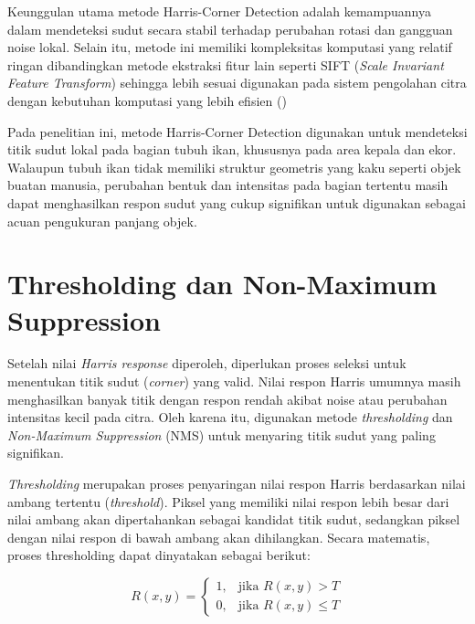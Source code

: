 Keunggulan utama metode Harris-Corner Detection adalah kemampuannya dalam mendeteksi sudut secara stabil terhadap perubahan rotasi dan gangguan noise lokal.
Selain itu, metode ini memiliki kompleksitas komputasi yang relatif ringan dibandingkan metode ekstraksi fitur lain seperti SIFT (\emph{Scale Invariant Feature Transform}) sehingga lebih sesuai digunakan pada sistem pengolahan citra dengan kebutuhan komputasi yang lebih efisien (\cite{Lowe2004})

Pada penelitian ini, metode Harris-Corner Detection digunakan untuk mendeteksi titik sudut lokal pada bagian tubuh ikan, khususnya pada area kepala dan ekor. 
Walaupun tubuh ikan tidak memiliki struktur geometris yang kaku seperti objek buatan manusia, perubahan bentuk dan intensitas pada bagian tertentu masih dapat menghasilkan respon sudut yang cukup signifikan untuk digunakan sebagai acuan pengukuran panjang objek.


\section{Thresholding dan Non-Maximum Suppression}

Setelah nilai \textit{Harris response} diperoleh, diperlukan proses seleksi untuk menentukan titik sudut (\textit{corner}) yang valid. Nilai respon Harris umumnya masih menghasilkan banyak titik dengan respon rendah akibat noise atau perubahan intensitas kecil pada citra. Oleh karena itu, digunakan metode \textit{thresholding} dan \textit{Non-Maximum Suppression} (NMS) untuk menyaring titik sudut yang paling signifikan.

\textit{Thresholding} merupakan proses penyaringan nilai respon Harris berdasarkan nilai ambang tertentu (\textit{threshold}). Piksel yang memiliki nilai respon lebih besar dari nilai ambang akan dipertahankan sebagai kandidat titik sudut, sedangkan piksel dengan nilai respon di bawah ambang akan dihilangkan. Secara matematis, proses thresholding dapat dinyatakan sebagai berikut:

\[
R(x,y) =
\begin{cases}
1, & \text{jika } R(x,y) > T \\
0, & \text{jika } R(x,y) \leq T
\end{cases}
\]

